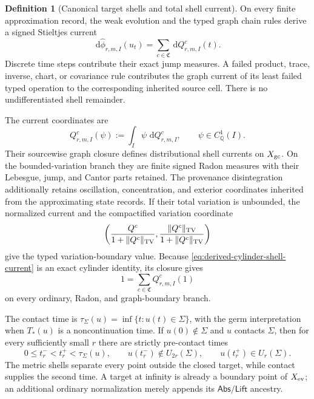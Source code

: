 \documentclass[11pt]{article}
\numberwithin{section}{part}
\theoremstyle{plain}
\theoremstyle{definition}
\newtheorem{definition}[definition]{Definition}
\theoremstyle{remark}
\newcommand{\dd}{\,\mathrm d}
\newcommand{\Abs}{\mathsf{Abs}}
\newcommand{\Lift}{\mathsf{Lift}}
\newcommand{\Channels}{\mathfrak C}
\begin{document}
\begin{definition}[Canonical target shells and total shell current]
On every finite approximation record, the weak evolution and the typed graph
chain rules derive a signed Stieltjes current
\begin{equation}
 \label{eq:derived-cylinder-shell-current}
 \dd\widehat\phi_{r,m,I}(u_t)
 =\sum_{c\in\Channels}\dd Q^c_{r,m,I}(t).
\end{equation}
Discrete time steps contribute their exact jump measures.  A failed product,
trace, inverse, chart, or covariance rule contributes the graph current of
its least failed typed operation to the corresponding inherited source cell.
There is no undifferentiated shell remainder.

The current coordinates are
\[
 Q^c_{r,m,I}(\psi)
 :=\int_I\psi\,\dd Q^c_{r,m,I},
 \qquad \psi\in C^1_{\mathbb Q}(I).
\]
Their sourcewise graph closure defines distributional shell currents on
\(X_{\rm gc}\).  On the bounded-variation branch they are finite signed Radon
measures with their Lebesgue, jump, and Cantor parts retained.  The provenance
disintegration additionally retains oscillation, concentration, and exterior
coordinates inherited from the approximating state records.  If their total
variation is unbounded, the normalized current and the compactified variation
coordinate
\[
 \left(\frac{Q^c}{1+\|Q^c\|_{\rm TV}},
       \frac{\|Q^c\|_{\rm TV}}{1+\|Q^c\|_{\rm TV}}\right)
\]
give the typed variation-boundary value.  Because
\eqref{eq:derived-cylinder-shell-current} is an exact cylinder identity, its
closure gives
\begin{equation}
 \label{eq:total-shell-current-relation}
 1=\sum_{c\in\Channels}Q^c_{r,m,I}(1)
\end{equation}
on every ordinary, Radon, and graph-boundary branch.

The contact time is
\(\tau_\Sigma(u)=\inf\{t:u(t)\in\Sigma\}\), with the germ interpretation
when \(T_*(u)\) is a noncontinuation time.  If \(u(0)\notin\Sigma\) and
\(u\) contacts \(\Sigma\), then for every sufficiently small \(r\) there are
strictly pre-contact times
\begin{equation}
 \label{eq:shell-crossing-times}
 0\le t_r^-<t_r^+<\tau_\Sigma(u),
 \qquad
 u(t_r^-)\notin U_{2r}(\Sigma),
 \qquad
 u(t_r^+)\in U_r(\Sigma).
\end{equation}
The metric shells separate every point outside the closed target, while
contact supplies the second time.  A target at infinity is already a boundary
point of \(X_{\rm ev}\); an additional ordinary normalization merely appends
its \(\Abs/\Lift\) ancestry.
\end{definition}
\end{document}

